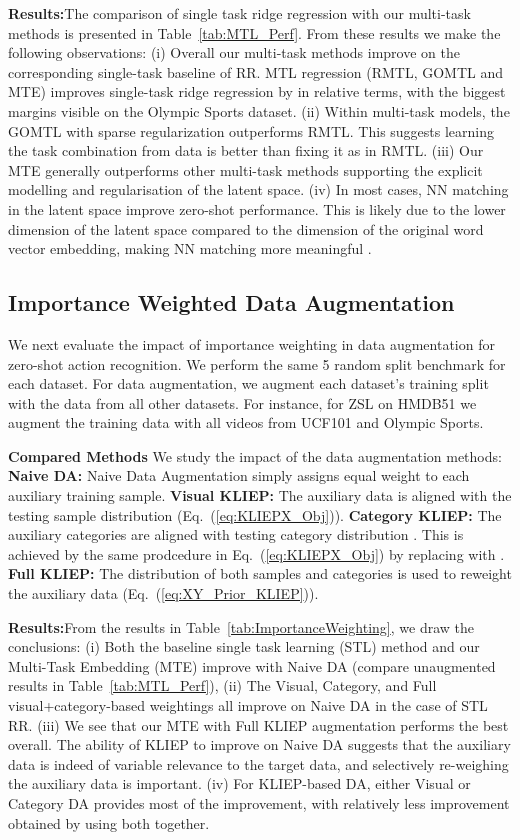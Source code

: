 \documentclass[runningheads]{llncs}
\begin{document}
\noindent\textbf{Results:}\quad The comparison of single
task ridge regression with our multi-task methods is presented in
Table~\ref{tab:MTL_Perf}. 
From these results we make the following
observations: (i) Overall our multi-task methods improve on the corresponding
single-task baseline of RR. MTL regression (RMTL, GOMTL and MTE) improves single-task ridge regression by  in
relative terms, with the biggest margins visible on the Olympic Sports
dataset. (ii) Within multi-task models, the GOMTL with sparse 
regularization outperforms RMTL. This suggests learning the task
combination  from data is better than fixing it as in RMTL. (iii)
Our MTE generally outperforms other multi-task methods supporting the
explicit modelling and regularisation of the latent space. (iv) In
most cases, NN matching in the latent space improve zero-shot
performance. This is likely due to the lower dimension of the latent
space compared to the dimension of the original word vector
embedding, making NN matching more meaningful \cite{Beyer1999}. 



\subsection{Importance Weighted Data Augmentation}

We next evaluate the impact of importance weighting in data augmentation for zero-shot action recognition. We perform the same 5 random split benchmark for each dataset. For data augmentation, we augment each dataset's training split with the data from all other datasets. For instance, for ZSL on HMDB51 we augment the training data with all videos from UCF101 and Olympic Sports. 

\noindent\textbf{Compared Methods}\quad
We study the impact of the data augmentation methods:
\textbf{Naive DA:} Naive Data Augmentation  \cite{Xu2015,xu2015zero} simply assigns equal weight to each auxiliary training sample. 
\textbf{Visual KLIEP:} The auxiliary data is aligned with the testing sample distribution  (Eq.~(\ref{eq:KLIEPX_Obj})).
\textbf{Category KLIEP:} The auxiliary categories are aligned with testing category distribution . This is achieved by the same prodcedure in Eq.~(\ref{eq:KLIEPX_Obj}) by replacing  with .
\textbf{Full  KLIEP:} The distribution of both samples  and categories  is used to reweight the auxiliary data (Eq.~(\ref{eq:XY_Prior_KLIEP})).

\noindent\textbf{Results:}\quad  From the results in Table~\ref{tab:ImportanceWeighting}, we draw the
 conclusions: (i) Both the  baseline single task learning (STL) method and our
Multi-Task Embedding (MTE) improve with Naive DA (compare unaugmented results
in Table~\ref{tab:MTL_Perf}), (ii) The Visual, Category, and
Full visual+category-based weightings all improve on Naive DA in the case of STL RR. 
(iii) We see that our MTE with Full KLIEP augmentation performs the best overall. The ability of
KLIEP to improve on Naive DA suggests that the auxiliary data is
indeed of variable relevance to the target data, and selectively
re-weighing the auxiliary data is important. (iv) For KLIEP-based DA,
either Visual or Category DA provides most of the improvement, with
relatively less improvement obtained by using both together. 
\end{document}
